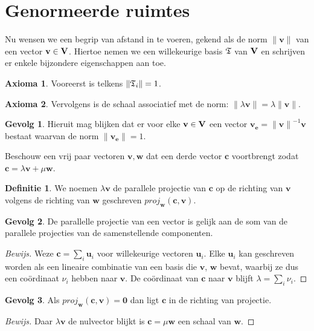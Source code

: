 \documentclass{amsart}
\theoremstyle{definition}
\newtheorem{axm}{Axioma}[section]
\newtheorem{dfn}{Definitie}[section]
\newtheorem{csq}{Gevolg}[section]
\newenvironment{bewijs}{\begin{proof}[Bewijs]}{\end{proof}}
\newcommand{\vecspace}[1][v]{\mathrm{\mathbf{\MakeUppercase#1}}}
\newcommand{\norm}[1]{\lVert{#1}\rVert}
\newcommand{\vvec}[1][v]{\mathbf{#1}}
\newcommand{\uvec}[1][v]{\vvec[#1]_\mathbf{e}}
\newcommand{\vnorm}[1]{\norm{\vvec[#1]}}
\newcommand{\zerovec}{\vvec[0]}
\newcommand{\vecrow}[1][a]{\mathfrak{\MakeUppercase{#1}}}
\newcommand{\rvec}[2][i]{{#2}_{#1}}
\newcommand{\rvecr}[2][i]{\rvec[#1]{\vecrow[#2]}}
\begin{document}
\section{Genormeerde ruimtes}

Nu wensen we een begrip van afstand in te voeren, gekend als de norm $\vnorm v$ van een vector $\vvec \in \vecspace$.
Hiertoe nemen we een willekeurige basis $\vecrow[t]$ van $\vecspace$ en schrijven er enkele bijzondere eigenschappen aan toe.
\begin{axm}
	Vooreerst is telkens $\norm{\rvecr{t}} = 1$.
\end{axm}

\begin{axm}
	Vervolgens is de schaal associatief met de norm: $\norm{\lambda \vvec} = \lambda\vnorm v$.
\end{axm}

\begin{csq}
	Hieruit mag blijken dat er voor elke $\vvec \in \vecspace$ een vector $\uvec = {\vnorm v}^{-1}\vvec$ bestaat waarvan de norm $\vnorm \uvec = 1$.
\end{csq}

Beschouw een vrij paar vectoren $\vvec, \vvec[w]$ dat een derde vector $\vvec[c]$ voortbrengt zodat $\vvec[c] = \lambda \vvec + \mu \vvec[w]$.

\begin{dfn}
	We noemen $\lambda\vvec$ de parallele projectie van $\vvec[c]$ op de richting van $\vvec$ volgens de richting van $\vvec[w]$ geschreven $proj_{\vvec[w]}(\vvec[c], \vvec)$.
\end{dfn}

\begin{csq}
	De parallelle projectie van een vector is gelijk aan de som van de parallele projecties van de samenstellende componenten.
	\begin{bewijs}
		Weze $\vvec[c] = \sum_{i} {\vvec[u]}_i$ voor willekeurige vectoren $\vvec[u]_i$.
		Elke ${\vvec[u]}_i$ kan geschreven worden als een lineaire combinatie van een basis die $\vvec$, $\vvec[w]$ bevat, waarbij ze dus een coördinaat $\nu_i$ hebben naar $\vvec$.
		De coördinaat van $\vvec[c]$ naar $\vvec$ blijft $\lambda = \sum_i \nu_i$.
	\end{bewijs}
\end{csq}

\begin{csq}
	Als $proj_{\vvec[w]}(\vvec[c], \vvec) = \zerovec$ dan ligt $\vvec[c]$ in de richting van projectie.
	\begin{bewijs}
		Daar $\lambda\vvec$ de nulvector blijkt is $\vvec[c] = \mu\vvec[w]$ een schaal van $\vvec[w]$.
	\end{bewijs}
\end{csq}
\end{document}
